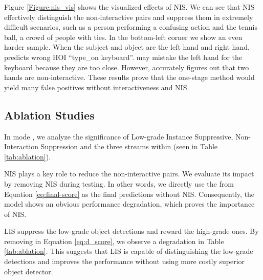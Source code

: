 \documentclass[10pt,twocolumn,letterpaper]{article}
\begin{document}
Figure \ref{Figure:nis_vis} shows the visualized effects of NIS. We can see that NIS effectively distinguish the non-interactive pairs and suppress them in extremely difficult scenarios, such as a person performing a confusing action and the tennis ball, a crowd of people with ties. In the bottom-left corner we show an even harder sample. When the subject and object are the left hand and right hand,  predicts wrong HOI ``type\_on keyboard''.  may mistake the left hand for the keyboard because they are too close. However,  accurately figures out that two hands are non-interactive. These results prove that the one-stage method would yield many false positives without interactiveness and NIS. 


\subsection{Ablation Studies}
\label{sec:ablation}
In mode , we analyze the significance of Low-grade Instance Suppressive, Non-Interaction Suppression and the three streams within  (seen in Table \ref{tab:ablation}).

 NIS plays a key role to reduce the non-interactive pairs. We evaluate its impact by removing NIS during testing. In other words, we directly use the  from Equation \ref{eq:final-score} as the final predictions without NIS. Consequently, the model shows an obvious performance degradation, which proves the importance of NIS.

 LIS suppress the low-grade object detections and reward the high-grade ones. By removing  in Equation \ref{eq:d_score}, we observe a degradation in Table \ref{tab:ablation}. This suggests that LIS is capable of distinguishing the low-grade detections and improves the performance without using more costly superior object detector. 

\begin{table}
\centering
{}
\caption{Non-interactive pairs reduction after performing NIS.}
\label{tab:transfer}
\vspace{-0.3cm}
\end{table}
\end{document}
